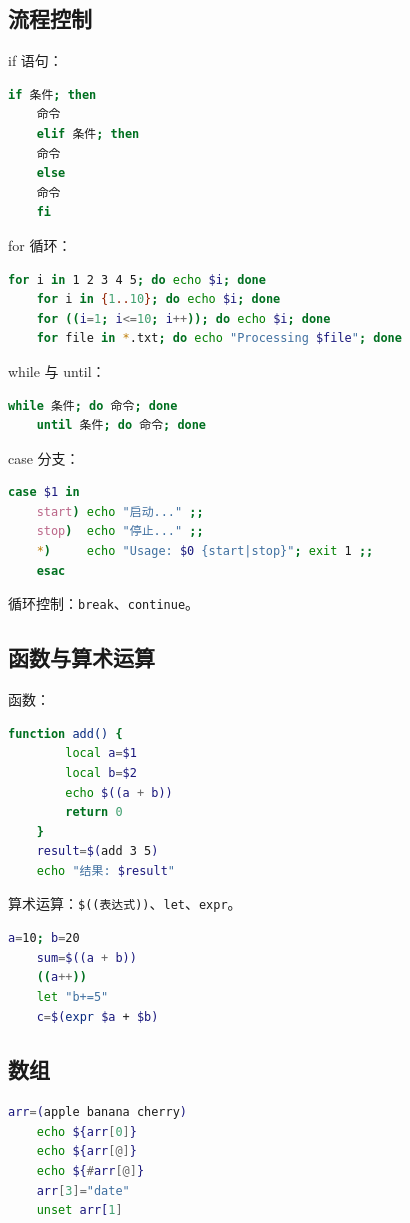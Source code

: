 \subsection{流程控制} if 语句：
\begin{lstlisting}[language=bash]
	if 条件; then
	命令
	elif 条件; then
	命令
	else
	命令
	fi
\end{lstlisting}

for 循环：
\begin{lstlisting}[language=bash]
	for i in 1 2 3 4 5; do echo $i; done
	for i in {1..10}; do echo $i; done
	for ((i=1; i<=10; i++)); do echo $i; done
	for file in *.txt; do echo "Processing $file"; done
\end{lstlisting}

while 与 until：
\begin{lstlisting}[language=bash]
	while 条件; do 命令; done
	until 条件; do 命令; done
\end{lstlisting}

case 分支：
\begin{lstlisting}[language=bash]
	case $1 in
	start) echo "启动..." ;;
	stop)  echo "停止..." ;;
	*)     echo "Usage: $0 {start|stop}"; exit 1 ;;
	esac
\end{lstlisting}

循环控制：\texttt{break}、\texttt{continue}。

\subsection{函数与算术运算} 函数：
\begin{lstlisting}[language=bash]
	function add() {
		local a=$1
		local b=$2
		echo $((a + b))
		return 0
	}
	result=$(add 3 5)
	echo "结果: $result"
\end{lstlisting}

算术运算：\texttt{\$((表达式))}、\texttt{let}、\texttt{expr}。
\begin{lstlisting}[language=bash]
	a=10; b=20
	sum=$((a + b))
	((a++))
	let "b+=5"
	c=$(expr $a + $b)
\end{lstlisting}

\subsection{数组}
\begin{lstlisting}[language=bash]
	arr=(apple banana cherry)
	echo ${arr[0]}
	echo ${arr[@]}
	echo ${#arr[@]}
	arr[3]="date"
	unset arr[1]
\end{lstlisting}


